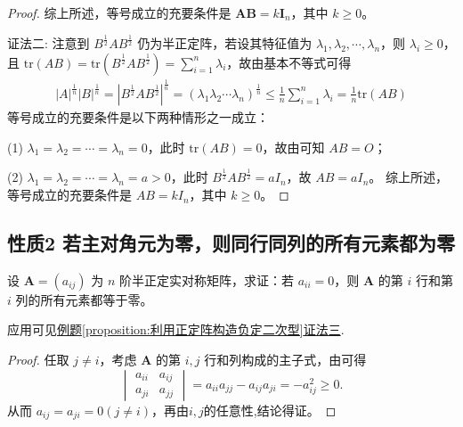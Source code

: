 \documentclass[../../main.tex]{subfiles}%
\begin{document}
\begin{proof}
综上所述，等号成立的充要条件是 \(\boldsymbol{A}\boldsymbol{B}=k\boldsymbol{I}_n\)，其中 \(k\geqslant 0\)。

{\color{blue}证法二:}
注意到 \(B^{\frac{1}{2}}AB^{\frac{1}{2}}\) 仍为半正定阵，若设其特征值为 \(\lambda_1,\lambda_2,\cdots,\lambda_n\)，则 \(\lambda_i \geqslant  0\)，且 \(\mathrm{tr}(AB)=\mathrm{tr}(B^{\frac{1}{2}}AB^{\frac{1}{2}})=\sum_{i = 1}^{n}\lambda_i\)，故由基本不等式可得
\begin{align*}
|A|^{\frac{1}{n}}|B|^{\frac{1}{n}} = |B^{\frac{1}{2}}AB^{\frac{1}{2}}|^{\frac{1}{n}} = (\lambda_1\lambda_2\cdots\lambda_n)^{\frac{1}{n}} \leqslant  \frac{1}{n}\sum_{i = 1}^{n}\lambda_i = \frac{1}{n}\mathrm{tr}(AB)
\end{align*}
等号成立的充要条件是以下两种情形之一成立：

(1) \(\lambda_1 = \lambda_2 = \cdots = \lambda_n = 0\)，此时 \(\mathrm{tr}(AB) = 0\)，故由可知 \(AB = O\)；

(2) \(\lambda_1 = \lambda_2 = \cdots = \lambda_n = a > 0\)，此时 \(B^{\frac{1}{2}}AB^{\frac{1}{2}} = aI_n\)，故 \(AB = aI_n\)。
综上所述，等号成立的充要条件是 \(AB = kI_n\)，其中 \(k \geqslant  0\)。 

\end{proof}

\subsection{性质2 若主对角元为零，则同行同列的所有元素都为零}

\begin{proposition}\label{proposition:若主对角元为零，则同行同列的所有元素都为零}
设 \(\boldsymbol{A}=(a_{ij})\) 为 \(n\) 阶半正定实对称矩阵，求证：若 \(a_{ii}=0\)，则 \(\boldsymbol{A}\) 的第 \(i\) 行和第 \(i\) 列的所有元素都等于零。
\end{proposition}
\begin{remark}
应用可见\hyperref[proposition:利用正定阵构造负定二次型]{例题\ref{proposition:利用正定阵构造负定二次型}证法三}.
\end{remark}
\begin{proof}

任取 \(j\neq i\)，考虑 \(\boldsymbol{A}\) 的第 \(i,j\) 行和列构成的主子式，由可得
\[
\begin{vmatrix}
a_{ii}&a_{ij}\\
a_{ji}&a_{jj}
\end{vmatrix}=a_{ii}a_{jj}-a_{ij}a_{ji}=-a_{ij}^2\geqslant 0.
\]
从而 \(a_{ij}=a_{ji}=0(j\neq i)\)，再由$i,j$的任意性,结论得证。

\end{proof}
\end{document}
